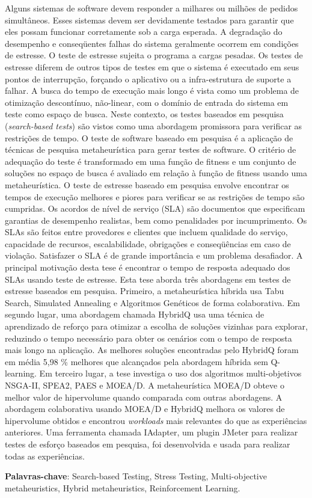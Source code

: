 
\begin{resumo} 
 
Alguns sistemas de software devem responder a milhares ou milhões de pedidos simultâneos.
Esses sistemas devem ser devidamente testados para garantir que eles possam funcionar corretamente sob a carga esperada. A degradação do desempenho e conseqüentes falhas do sistema geralmente ocorrem em condições de estresse. O teste de estresse sujeita o programa a cargas pesadas. Os testes de estresse diferem de outros tipos de testes em que o sistema é executado em seus pontos de interrupção, forçando o aplicativo ou a infra-estrutura de suporte a falhar. A busca do tempo de execução mais longo é vista como um problema de otimização descontínuo, não-linear, com o domínio de entrada do sistema em teste como espaço de busca. Neste contexto, os testes baseados em pesquisa (\textit{search-based tests}) são vistos como uma abordagem promissora para verificar as restrições de tempo. O teste de software baseado em pesquisa é a aplicação de técnicas de pesquisa metaheurística para gerar testes de software. O critério de adequação do teste é transformado em uma função de fitness e um conjunto de soluções no espaço de busca é avaliado em relação à função de fitness usando uma metaheurística. O teste de estresse baseado em pesquisa envolve encontrar os tempos de execução melhores e piores para verificar se as restrições de tempo são cumpridas. Os acordos de nível de serviço (SLA) são documentos que especificam garantias de desempenho realistas, bem como penalidades por incumprimento. Os SLAs são feitos entre provedores e clientes que incluem qualidade do serviço, capacidade de recursos, escalabilidade, obrigações e conseqüências em caso de violação. Satisfazer o SLA é de grande importância e um problema desafiador. A principal motivação desta tese é encontrar o tempo de resposta adequado dos SLAs usando teste de estresse. Esta tese aborda três abordagens em testes de estresse baseados em pesquisa. Primeiro, a metaheurística híbrida usa Tabu Search, Simulated Annealing e Algoritmos Genéticos de forma colaborativa. Em segundo lugar, uma abordagem chamada HybridQ usa uma técnica de aprendizado de reforço para otimizar a escolha de soluções vizinhas para explorar, reduzindo o tempo necessário para obter os cenários com o tempo de resposta mais longo na aplicação. As melhores soluções encontradas pelo HybridQ foram em média 5,98 \% melhores que alcançados pela abordagem híbrida sem Q-learning. Em terceiro lugar, a tese investiga o uso dos algoritmos multi-objetivos NSGA-II, SPEA2, PAES e MOEA/D. A metaheurística MOEA/D obteve o melhor valor de hipervolume quando comparada com outras abordagens. A abordagem colaborativa usando MOEA/D e HybridQ melhora os valores de hipervolume obtidos e encontrou \textit{workloads} mais relevantes do que as experiências anteriores. Uma ferramenta chamada IAdapter, um plugin JMeter para realizar testes de esforço baseados em pesquisa, foi desenvolvida e usada para realizar todas as experiências.

\textbf{Palavras-chave}: Search-based Testing, Stress Testing, Multi-objective metaheuristics, Hybrid metaheuristics, Reinforcement Learning.

\end{resumo}

